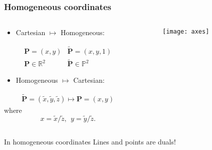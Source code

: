 \begin{frame}
\frametitle{Homogeneous coordinates}
\begin{columns}
\begin{column}{.5\textwidth}
\begin{itemize}
\item Cartesian $\mapsto$ Homogeneous:
\end{itemize}
\[
\begin{array}{cc}
\textbf{P} = \left ( x, y \right ) & \tilde{\textbf{P}} = \left ( x, y, 1 \right ) \\
\textbf{P} \in \mathbb{R}^2 & \tilde{\textbf{P}} \in \mathbb{P}^2
\end{array}
\]
\begin{itemize}
\item Homogeneous $\mapsto$ Cartesian:
\end{itemize}
\[
\begin{array}{cc}
\tilde{\textbf{P}} = \left ( \tilde{x}, \tilde{y}, \tilde{z} \right ) \mapsto \textbf{P} = \left ( x, y \right )
\end{array}
\]
where
\[
x = \tilde{x}/\tilde{z},\ \ y = \tilde{y}/\tilde{z}.
\]
\end{column}
\begin{column}{.5\textwidth}
\begin{figure}[!h]
\centering
\texttt{[image: axes]}
\end{figure}
\end{column}
\end{columns}
\begin{block}{In homogeneous coordinates}
Lines and points are duals!
\end{block}
\end{frame}

